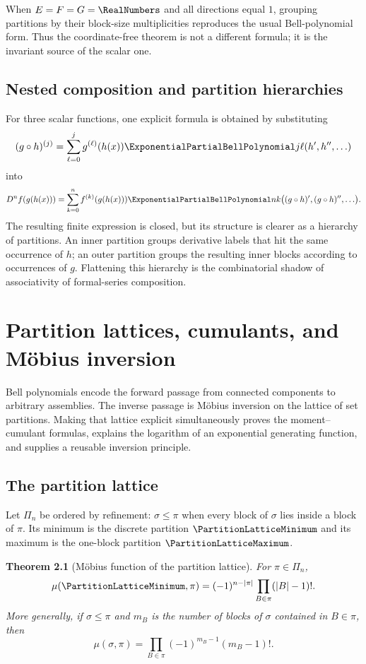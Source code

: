 \documentclass[11pt,a4paper,oneside,openany]{book}
\newtheorem{theorem}{Theorem}[chapter]
\theoremstyle{definition}
\theoremstyle{remark}
\begin{document}
When $E=F=G=\RealNumbers$ and all directions equal $1$, grouping partitions by their
block-size multiplicities reproduces the usual Bell-polynomial form.  Thus the
coordinate-free theorem is not a different formula; it is the invariant source
of the scalar one.

\section{Nested composition and partition hierarchies}

For three scalar functions, one explicit formula is obtained by substituting
\[
 (g\circ h)^{(j)}
 =\sum_{\ell=0}^j g^{(\ell)}(h(x))
   \ExponentialPartialBellPolynomial j\ell(h',h'',\ldots)
\]
into
\[
 D^n f(g(h(x)))
 =\sum_{k=0}^n f^{(k)}(g(h(x)))
   \ExponentialPartialBellPolynomial nk\bigl((g\circ h)',(g\circ h)'',\ldots\bigr).
\]
The resulting finite expression is closed, but its structure is clearer as a
hierarchy of partitions.  An inner partition groups derivative labels that hit
the same occurrence of $h$; an outer partition groups the resulting inner
blocks according to occurrences of $g$.  Flattening this hierarchy is the
combinatorial shadow of associativity of formal-series composition.

\chapter{Partition lattices, cumulants, and M\"obius inversion}
\label{ch:partition-lattice}

Bell polynomials encode the forward passage from connected components to
arbitrary assemblies.  The inverse passage is M\"obius inversion on the lattice
of set partitions.  Making that lattice explicit simultaneously proves the
moment--cumulant formulas, explains the logarithm of an exponential generating
function, and supplies a reusable inversion principle.

\section{The partition lattice}

Let $\Pi_n$ be ordered by refinement: $\sigma\le\pi$ when every block of
$\sigma$ lies inside a block of $\pi$.  Its minimum is the discrete partition
$\PartitionLatticeMinimum$ and its maximum is the one-block partition $\PartitionLatticeMaximum$.

\begin{theorem}[M\"obius function of the partition lattice]
For $\pi\in\Pi_n$,
\begin{equation}
 \mu(\PartitionLatticeMinimum,\pi)
 =(-1)^{n-|\pi|}\prod_{B\in\pi}(|B|-1)!.
 \label{new:eq:partition-mobius}
\end{equation}
More generally, if $\sigma\le\pi$ and $m_B$ is the number of blocks of
$\sigma$ contained in $B\in\pi$, then
\begin{equation}
 \mu(\sigma,\pi)
 =\prod_{B\in\pi}(-1)^{m_B-1}(m_B-1)!.
 \label{new:eq:interval-mobius}
\end{equation}
\end{theorem}
\end{document}
